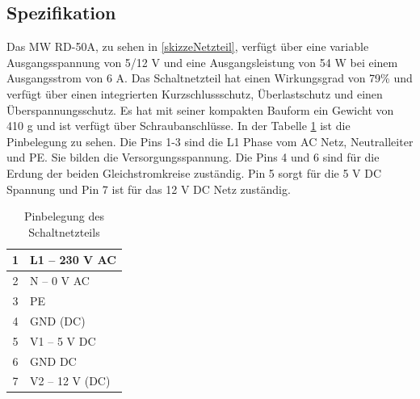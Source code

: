 \subsection{Spezifikation}
Das MW RD-50A, zu sehen in \ref{skizzeNetzteil}, verfügt über eine variable Ausgangsspannung von 5/12 V und eine Ausgangsleistung von 54 W bei einem Ausgangsstrom von 6 A. Das Schaltnetzteil hat einen Wirkungsgrad von 79\% und verfügt über einen integrierten Kurzschlussschutz, Überlastschutz und einen Überspannungsschutz. Es hat mit seiner kompakten Bauform ein Gewicht von 410 g und ist verfügt über Schraubanschlüsse. In der Tabelle \ref{tab:pinbelegung} ist die Pinbelegung zu sehen. Die Pins 1-3 sind die L1 Phase vom AC Netz, Neutralleiter und PE. Sie bilden die Versorgungsspannung. Die Pins 4 und 6 sind für die Erdung der beiden Gleichstromkreise zuständig. Pin 5 sorgt für die 5 V DC Spannung und Pin 7 ist für das 12 V DC Netz zuständig.\cite{MeanWell:2014} \cite{Reichelt:2025}
\begin{table}[H]
	\centering
	\caption{Pinbelegung des Schaltnetzteils}
	\label{tab:pinbelegung}
	\begin{tabular}{c|l}
		\hline
		1  & L1 – 230 V AC \\
		\hline
		2  & N – 0 V AC    \\
		\hline
		3  & PE            \\
		\hline
		4  & GND (DC)   \\
		\hline
		5  & V1 – 5 V DC      \\
		\hline
		6  & GND DC  \\
		\hline
		7  & V2 – 12 V (DC)      \\
	\end{tabular}
\end{table}

